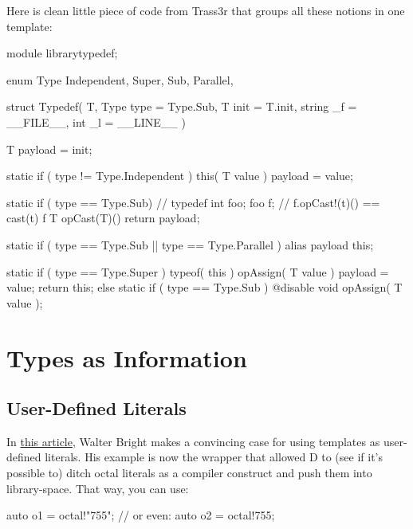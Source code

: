 
Here is clean little piece of code from Trass3r that groups all these notions in one template:

\begin{dcode}
module librarytypedef;

enum Type
{
    Independent,
    Super,
    Sub,
    Parallel,
}

struct Typedef( T, 
                Type type = Type.Sub, 
                T init = T.init, 
                string _f = __FILE__,
                int _l = __LINE__ )
{
    T payload = init;

    static if ( type != Type.Independent )
        this( T value )
        {
            payload = value;
        }

    static if ( type == Type.Sub)
        // typedef int foo; foo f;
        // f.opCast!(t)() == cast(t) f
        T opCast(T)()
        {
            return payload;
        }

    static if ( type == Type.Sub || type == Type.Parallel )
        alias payload this;

    static if ( type == Type.Super )
        typeof( this ) opAssign( T value )
        {
            payload = value;
            return this;
        }
    else static if ( type == Type.Sub )
        @disable void opAssign( T value );
}
\end{dcode}


\section{Types as Information}
\label{typesasinformation}

\subsection{User-Defined Literals}\label{userdefinedliterals}

In \href{http://drdobbs.com/blogs/tools/229401068}{this article}, Walter Bright makes a convincing case for using templates as user-defined literals. His example is now the  wrapper that allowed D to (see if it's possible to) ditch octal literals as a compiler construct and push them into library-space. That way, you can use:

\begin{dcode}
auto o1 = octal!"755";
// or even:
auto o2 = octal!755;
\end{dcode}

